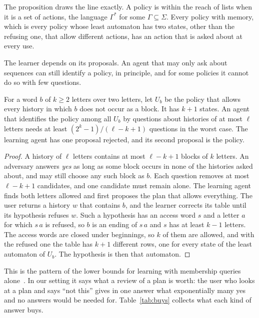 \documentclass[acmsmall,nonacm,screen]{acmart}
\begin{document}
The proposition draws the line exactly. A policy is within the reach of lists when it is a
set of actions, the language $\Gamma^{*}$ for some $\Gamma \subseteq \Sigma$. Every policy
with memory, which is every policy whose least automaton has two states, other than the
refusing one, that allow different actions, has an action that is asked about at every use.

The learner depends on its proposals. An agent that may only ask about sequences can still
identify a policy, in principle, and for some policies it cannot do so with few questions.

\begin{proposition}
\label{prop:block}
For a word $b$ of $k \ge 2$ letters over two letters, let $U_b$ be the policy that allows
every history in which $b$ does not occur as a block. It has $k + 1$ states. An agent that
identifies the policy among all $U_b$ by questions about histories of at most $\ell$ letters
needs at least $(2^k - 1) / (\ell - k + 1)$ questions in the worst case. The learning agent
has one proposal rejected, and its second proposal is the policy.
\end{proposition}

\begin{proof}
A history of $\ell$ letters contains at most $\ell - k + 1$ blocks of $k$ letters. An
adversary answers \emph{yes} as long as some block occurs in none of the histories asked
about, and may still choose any such block as $b$. Each question removes at most $\ell - k +
1$ candidates, and one candidate must remain alone. The learning agent finds both letters
allowed and first proposes the plan that allows everything. The user returns a history $w$
that contains $b$, and the learner corrects its table until its hypothesis refuses $w$. Such
a hypothesis has an access word $s$ and a letter $a$ for which $s\,a$ is refused, so $b$ is
an ending of $s\,a$ and $s$ has at least $k - 1$ letters. The access words are closed under
beginnings, so $k$ of them are allowed, and with the refused one the table has $k + 1$
different rows, one for every state of the least automaton of $U_b$. The hypothesis is then
that automaton.
\end{proof}

This is the pattern of the lower bounds for learning with membership queries
alone~\cite{angluin1981}. In our setting it says what a review of a plan is worth: the user
who looks at a plan and says ``not this'' gives in one answer what exponentially many yes
and no answers would be needed for. Table~\ref{tab:buys} collects what each kind of answer
buys.
\end{document}
